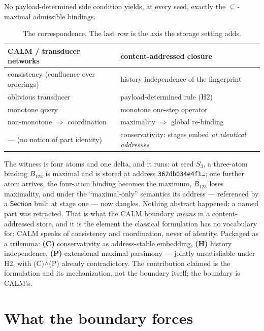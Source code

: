 \documentclass[a4paper,UKenglish,cleveref,autoref,thm-restate]{lipics-v2021}
\begin{document}
\begin{theorem}
No payload-determined side condition yields, at every seed, exactly the $\subseteq$-maximal admissible bindings.
\end{theorem}

\begin{table}[t]
\caption{The correspondence. The last row is the axis the storage setting adds.}\label{tab:dict}
\centering\small
\begin{tabular}{ll}
\toprule
CALM / transducer networks & content-addressed closure \\
\midrule
consistency (confluence over orderings) & history independence of the fingerprint \\
oblivious transducer & payload-determined rule (H2) \\
monotone query & monotone one-step operator \\
non-monotone $\Rightarrow$ coordination & maximality $\Rightarrow$ global re-binding \\
--- (no notion of part identity) & conservativity: stages embed \emph{at identical addresses} \\
\bottomrule
\end{tabular}
\end{table}

The witness is four atoms and one delta, and it runs: at seed $S_3$, a three-atom binding $B_{123}$ is maximal and is stored at address \texttt{362db034e4f1\ldots}; one further atom arrives, the four-atom binding becomes the maximum, $B_{123}$ loses maximality, and under the ``maximal-only'' semantics its address --- referenced by a $\mathsf{Section}$ built at stage one --- now dangles. Nothing abstract happened: a named part was retracted. That is what the CALM boundary \emph{means} in a content-addressed store, and it is the element the classical formulation has no vocabulary for: CALM speaks of consistency and coordination, never of identity. Packaged as a trilemma: \textbf{(C)} conservativity as address-stable embedding, \textbf{(H)} history independence, \textbf{(P)} extensional maximal parsimony --- jointly unsatisfiable under H2, with (C)${\wedge}$(P) already contradictory. The contribution claimed is the formulation and its mechanization, not the boundary itself; the boundary is CALM's.

\section{What the boundary forces}
\end{document}
